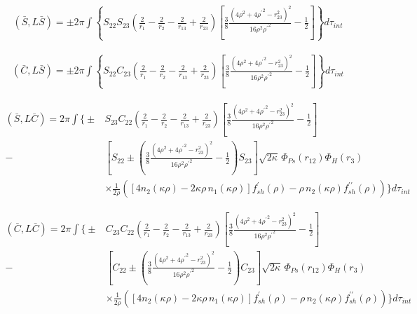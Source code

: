 \documentclass[Dissertation.tex]{subfiles}
\begin{document}
\begin{align}
\label{eq:DWaveSBarSBar}
\left(\bar{S},L\bar{S}\right) = \pm 2\pi \int \left\{ S_{22} S_{23} \left(\frac{2}{r_1} - \frac{2}{r_2} - \frac{2}{r_{13}} + \frac{2}{r_{23}} \right) \left[ \frac{3}{8} \frac{(4\rho^2 + 4 {\rho^\prime}^2 - r_{23}^2)^2}{16 \rho^2 {\rho^\prime}^2} - \frac{1}{2} \right] \right\} d\tau_{int}
\end{align}

\begin{align}
\label{eq:DWaveCBarSBar}
\left(\bar{C},L\bar{S}\right) = \pm 2\pi \int \left\{ S_{22} C_{23} \left(\frac{2}{r_1} - \frac{2}{r_2} - \frac{2}{r_{13}} + \frac{2}{r_{23}} \right) \left[ \frac{3}{8} \frac{(4\rho^2 + 4 {\rho^\prime}^2 - r_{23}^2)^2}{16 \rho^2 {\rho^\prime}^2} - \frac{1}{2} \right] \right\} d\tau_{int}
\end{align}

\begin{align}
\label{eq:DWaveSBarCBar}
\nonumber \left(\bar{S},L\bar{C}\right) = 2\pi \int \Bigg\{ \pm & S_{23} C_{22} \left(\frac{2}{r_1} - \frac{2}{r_2} - \frac{2}{r_{13}} + \frac{2}{r_{23}} \right) \left[ \frac{3}{8} \frac{(4\rho^2 + 4 {\rho^\prime}^2 - r_{23}^2)^2}{16 \rho^2 {\rho^\prime}^2} - \frac{1}{2} \right] \\
\nonumber - & \left[ S_{22} \pm \left( \frac{3}{8} \frac{(4\rho^2 + 4 {\rho^\prime}^2 - r_{23}^2)^2}{16 \rho^2 {\rho^\prime}^2} - \frac{1}{2} \right) S_{23} \right] \sqrt{2\kappa} \, \Phi_{Ps}\left(r_{12}\right) \Phi_H\left(r_3\right) \\
& \times \frac{1}{2\rho} \left( \left[ 4 n_2(\kappa\rho) - 2 \kappa\rho \, n_1(\kappa\rho) \right] f_{sh}^\prime(\rho) - \rho \, n_2(\kappa\rho) f_{sh}^{\prime\prime}(\rho) \right) \Bigg\} d\tau_{int}
\end{align}

\begin{align}
\label{eq:DWaveCBarCBar}
\nonumber \left(\bar{C},L\bar{C}\right) = 2\pi \int \Bigg\{ \pm & C_{23} C_{22} \left(\frac{2}{r_1} - \frac{2}{r_2} - \frac{2}{r_{13}} + \frac{2}{r_{23}} \right) \left[ \frac{3}{8} \frac{(4\rho^2 + 4 {\rho^\prime}^2 - r_{23}^2)^2}{16 \rho^2 {\rho^\prime}^2} - \frac{1}{2} \right] \\
\nonumber - & \left[ C_{22} \pm \left( \frac{3}{8} \frac{(4\rho^2 + 4 {\rho^\prime}^2 - r_{23}^2)^2}{16 \rho^2 {\rho^\prime}^2} - \frac{1}{2} \right) C_{23} \right] \sqrt{2\kappa} \, \Phi_{Ps}\left(r_{12}\right) \Phi_H\left(r_3\right) \\
& \times \frac{1}{2\rho} \left( \left[ 4 n_2(\kappa\rho) - 2 \kappa\rho \, n_1(\kappa\rho) \right] f_{sh}^\prime(\rho) - \rho \, n_2(\kappa\rho) f_{sh}^{\prime\prime}(\rho) \right) \Bigg\} d\tau_{int}
\end{align}
\end{document}
